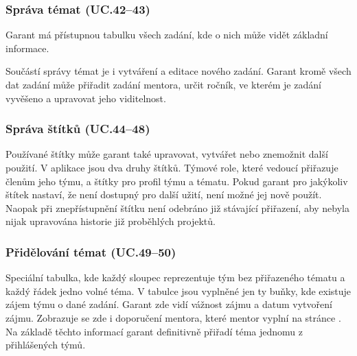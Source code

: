 \documentclass[czech,BP]{thesiskiv}
\begin{document}
			\subsubsection{Správa témat (UC.42--43)}
			\par Garant má přístupnou tabulku všech zadání, kde o nich může vidět základní informace. 
			\par Součástí správy témat je i vytváření a editace nového zadání. Garant kromě všech dat zadání může přiřadit zadání mentora, určit ročník, ve kterém je zadání vyvěšeno a upravovat jeho viditelnost.
			\subsubsection{Správa štítků (UC.44--48)}
			\par Používané štítky může garant také upravovat, vytvářet nebo znemožnit další použití. V aplikace jsou dva druhy štítků. Týmové role, které vedoucí přiřazuje členům jeho týmu, a štítky pro profil týmu a tématu. Pokud garant pro jakýkoliv štítek nastaví, že není dostupný pro další užití, není možné jej nově použít. Naopak při znepřístupnění štítku není odebráno již stávající přiřazení, aby nebyla nijak upravována historie již proběhlých projektů.
			\subsubsection{Přidělování témat (UC.49--50)}
			\par Speciální tabulka, kde každý sloupec reprezentuje tým bez přiřazeného tématu a každý řádek jedno volné téma. V tabulce jsou vyplněné jen ty buňky, kde existuje zájem týmu o dané zadání. Garant zde vidí vážnost zájmu a datum vytvoření zájmu. Zobrazuje se zde i doporučení mentora, které mentor vyplní na stránce . Na základě těchto informací garant definitivně přiřadí téma jednomu z přihlášených týmů.
\end{document}
